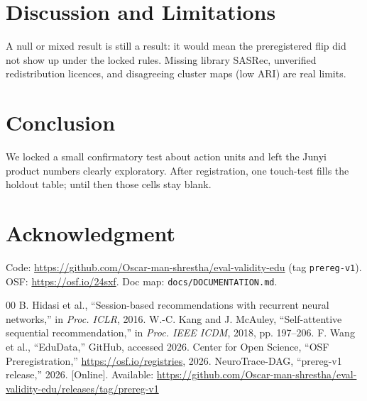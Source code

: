\documentclass[conference,a4paper]{IEEEtran}
\begin{document}
\section{Discussion and Limitations}
A null or mixed result is still a result: it would mean the preregistered flip did not show up under the locked rules.
Missing library SASRec, unverified redistribution licences, and disagreeing cluster maps (low ARI) are real limits.

\section{Conclusion}
We locked a small confirmatory test about action units and left the Junyi product numbers clearly exploratory.
After registration, one touch-test fills the holdout table; until then those cells stay blank.

\section*{Acknowledgment}
Code: \url{https://github.com/Oscar-man-shrestha/eval-validity-edu} (tag \texttt{prereg-v1}).
OSF: \url{https://osf.io/24sxf}. Doc map: \texttt{docs/DOCUMENTATION.md}.

\begin{thebibliography}{00}
 B. Hidasi et al., ``Session-based recommendations with recurrent neural networks,'' in \emph{Proc. ICLR}, 2016.
 W.-C. Kang and J. McAuley, ``Self-attentive sequential recommendation,'' in \emph{Proc. IEEE ICDM}, 2018, pp. 197--206.
 F. Wang et al., ``EduData,'' GitHub, accessed 2026.
 Center for Open Science, ``OSF Preregistration,'' \url{https://osf.io/registries}, 2026.
 NeuroTrace-DAG, ``prereg-v1 release,'' 2026. [Online]. Available: \url{https://github.com/Oscar-man-shrestha/eval-validity-edu/releases/tag/prereg-v1}
\end{thebibliography}
\end{document}
